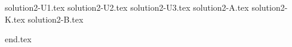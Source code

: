 \documentclass{../../../../style/mkimain}
\begin{document}
{solution2-U1.tex}
{solution2-U2.tex}
\newpage
{solution2-U3.tex}
{solution2-A.tex}
{solution2-K.tex}
{solution2-B.tex}

{end.tex}
\end{document}
